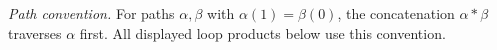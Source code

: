 \documentclass[11pt,reqno]{amsart}
\theoremstyle{definition}
\theoremstyle{remark}
\begin{document}
\emph{Path convention.}  For paths $\alpha,\beta$ with
$\alpha(1)=\beta(0)$, the concatenation $\alpha*\beta$ traverses
$\alpha$ first.  All displayed loop products below use this
convention.


\providecommand{\C}{\mathbb{C}}
\providecommand{\D}{\mathbb{D}}
\providecommand{\T}{\mathbb{T}}
\providecommand{\N}{\mathbb{N}}
\providecommand{\Z}{\mathbb{Z}}
\providecommand{\Ann}{\mathbb{A}}          %
\providecommand{\BU}{\mathbf{U}}           %
\providecommand{\BV}{\mathbf{V}}           %
\providecommand{\sm}{\setminus}
\providecommand{\KK}{\mathcal{K}}          %
\providecommand{\Mod}{\operatorname{mod}}        %
\providecommand{\Ind}{\operatorname{Ind}}        %
\end{document}
